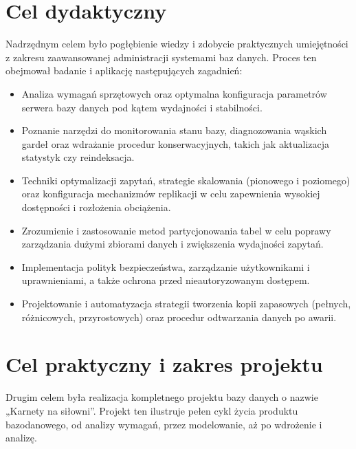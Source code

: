 \documentclass[letterpaper,10pt,polish]{sphinxmanual}
\begin{document}
\section{Cel dydaktyczny}
\label{\detokenize{rozdzial1/rozdzial1:cel-dydaktyczny}}
\sphinxAtStartPar
Nadrzędnym celem było pogłębienie wiedzy i zdobycie praktycznych umiejętności z zakresu zaawansowanej administracji systemami baz danych. Proces ten obejmował badanie i aplikację następujących zagadnień:
\begin{itemize}
\item {} 
\sphinxAtStartPar
{} Analiza wymagań sprzętowych oraz optymalna konfiguracja parametrów serwera bazy danych pod kątem wydajności i stabilności.

\item {} 
\sphinxAtStartPar
{} Poznanie narzędzi do monitorowania stanu bazy, diagnozowania wąskich gardeł oraz wdrażanie procedur konserwacyjnych, takich jak aktualizacja statystyk czy reindeksacja.

\item {} 
\sphinxAtStartPar
{} Techniki optymalizacji zapytań, strategie skalowania (pionowego i poziomego) oraz konfiguracja mechanizmów replikacji w celu zapewnienia wysokiej dostępności i rozłożenia obciążenia.

\item {} 
\sphinxAtStartPar
{} Zrozumienie i zastosowanie metod partycjonowania tabel w celu poprawy zarządzania dużymi zbiorami danych i zwiększenia wydajności zapytań.

\item {} 
\sphinxAtStartPar
{} Implementacja polityk bezpieczeństwa, zarządzanie użytkownikami i uprawnieniami, a także ochrona przed nieautoryzowanym dostępem.

\item {} 
\sphinxAtStartPar
{} Projektowanie i automatyzacja strategii tworzenia kopii zapasowych (pełnych, różnicowych, przyrostowych) oraz procedur odtwarzania danych po awarii.

\end{itemize}


\section{Cel praktyczny i zakres projektu}
\label{\detokenize{rozdzial1/rozdzial1:cel-praktyczny-i-zakres-projektu}}
\sphinxAtStartPar
Drugim celem była realizacja kompletnego projektu bazy danych o nazwie „Karnety na siłowni”. Projekt ten ilustruje pełen cykl życia produktu bazodanowego, od analizy wymagań, przez modelowanie, aż po wdrożenie i analizę.
\end{document}
